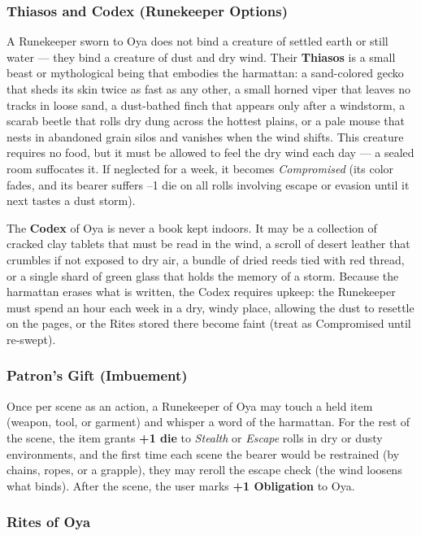 \subsubsection*{Thiasos and Codex (Runekeeper Options)}

A Runekeeper sworn to Oya does not bind a creature of settled earth or still water --- they bind a creature of dust and dry wind. Their \textbf{Thiasos} is a small beast or mythological being that embodies the harmattan: a sand-colored gecko that sheds its skin twice as fast as any other, a small horned viper that leaves no tracks in loose sand, a dust-bathed finch that appears only after a windstorm, a scarab beetle that rolls dry dung across the hottest plains, or a pale mouse that nests in abandoned grain silos and vanishes when the wind shifts. This creature requires no food, but it must be allowed to feel the dry wind each day --- a sealed room suffocates it. If neglected for a week, it becomes \textit{Compromised} (its color fades, and its bearer suffers --1 die on all rolls involving escape or evasion until it next tastes a dust storm).

The \textbf{Codex} of Oya is never a book kept indoors. It may be a collection of cracked clay tablets that must be read in the wind, a scroll of desert leather that crumbles if not exposed to dry air, a bundle of dried reeds tied with red thread, or a single shard of green glass that holds the memory of a storm. Because the harmattan erases what is written, the Codex requires upkeep: the Runekeeper must spend an hour each week in a dry, windy place, allowing the dust to resettle on the pages, or the Rites stored there become faint (treat as Compromised until re-swept).

\subsubsection*{Patron's Gift (Imbuement)}

Once per scene as an action, a Runekeeper of Oya may touch a held item (weapon, tool, or garment) and whisper a word of the harmattan. For the rest of the scene, the item grants \textbf{+1 die} to \textit{Stealth} or \textit{Escape} rolls in dry or dusty environments, and the first time each scene the bearer would be restrained (by chains, ropes, or a grapple), they may reroll the escape check (the wind loosens what binds). After the scene, the user marks \textbf{+1 Obligation} to Oya.

\subsubsection*{Rites of Oya}

